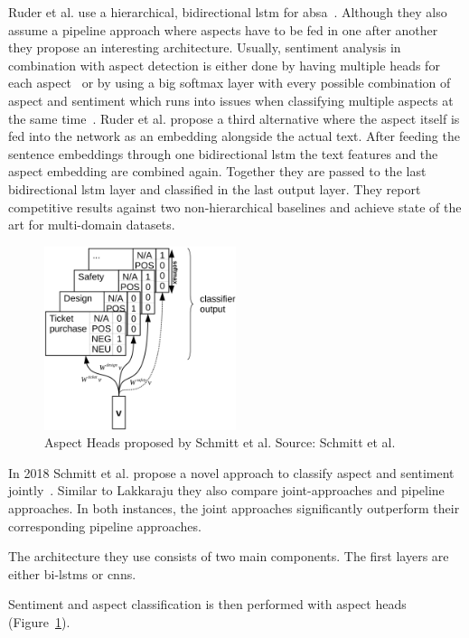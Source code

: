 Ruder et al. use a hierarchical, bidirectional \gls{lstm} for \gls{absa}~\cite{Ruder2016}. Although they also assume a pipeline approach where aspects have to be fed in one after another they propose an interesting architecture. Usually, sentiment analysis in combination with aspect detection is either done by having multiple heads for each aspect~\cite{Schmitt2018} or by using a big softmax layer with every possible combination of aspect and sentiment which runs into issues when classifying multiple aspects at the same time~\cite{Lakkaraju2014}. Ruder et al. propose a third alternative where the aspect itself is fed into the network as an embedding alongside the actual text. After feeding the sentence embeddings through one bidirectional \gls{lstm} the text features and the aspect embedding are combined again. Together they are passed to the last bidirectional \gls{lstm} layer and classified in the last output layer. They report competitive results against two non-hierarchical baselines and achieve state of the art for multi-domain datasets.
\medskip
\begin{figure}[htp]
    \centering
    \includegraphics[width=0.5\textwidth]{figures/02_relatedWork/02_jabsa}
    \caption{Aspect Heads proposed by Schmitt et al. Source: Schmitt et al.~\cite{Schmitt2018}}
    \label{fig:02_j-absa}
\end{figure}

In 2018 Schmitt et al. propose a novel approach to classify aspect and sentiment jointly~\cite{Schmitt2018}. Similar to Lakkaraju they also compare joint-approaches and pipeline approaches. In both instances, the joint approaches significantly outperform their corresponding pipeline approaches. 

The architecture they use consists of two main components. The first layers are either bi-\glspl{lstm} or \glspl{cnn}. 

Sentiment and aspect classification is then performed with aspect heads {(Figure~\ref{fig:02_j-absa})}. 

